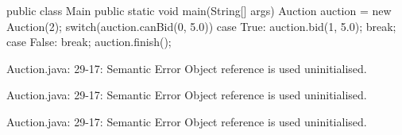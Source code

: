 \begin{code}
public class Main {
  public static void main(String[] args) {
    Auction auction = new Auction(2);
    switch(auction.canBid(0, 5.0)){
      case True:
        auction.bid(1, 5.0);
        break;
      case False:
        break;
    }
    auction.finish();
  }
}\end{code}

\lstset{language=,caption=Mungo's output}
\begin{code}

Auction.java: 29-17: Semantic Error
		Object reference is used uninitialised.

Auction.java: 29-17: Semantic Error
		Object reference is used uninitialised.

Auction.java: 29-17: Semantic Error
		Object reference is used uninitialised.
\end{code}

